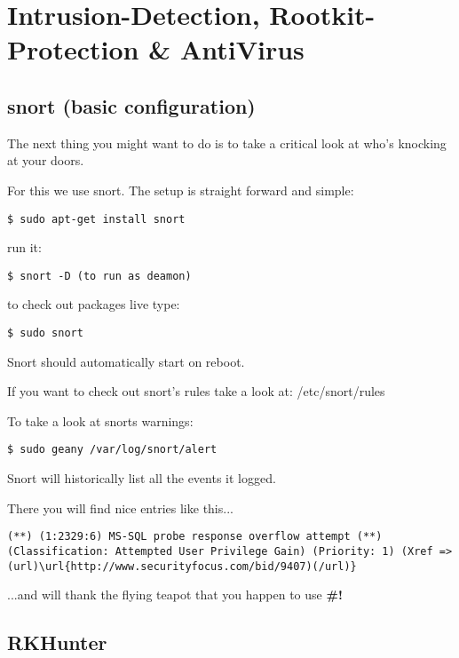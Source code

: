 \documentclass{article}
\begin{document}
\section{Intrusion-Detection, Rootkit-Protection \& AntiVirus}
\subsection{snort (basic configuration)}


 The next thing you might want to do is to take a critical look at who's knocking at your doors.


 For this we use snort. The setup is straight forward and simple: 
\begin{lstlisting}
$ sudo apt-get install snort 
\end{lstlisting}



 run it:
\begin{lstlisting}
$ snort -D (to run as deamon)
\end{lstlisting}



 to check out packages live type:
\begin{lstlisting}
$ sudo snort
\end{lstlisting}



 Snort should automatically start on reboot. 


 If you want to check out snort's rules take a look at: /etc/snort/rules


 To take a look at snorts warnings:
\begin{lstlisting}
$ sudo geany /var/log/snort/alert
\end{lstlisting}



 Snort will historically list all the events it logged. 


 There you will find nice entries like this...
\begin{lstlisting}
(**) (1:2329:6) MS-SQL probe response overflow attempt (**) (Classification: Attempted User Privilege Gain) (Priority: 1) (Xref => (url)\url{http://www.securityfocus.com/bid/9407)(/url)}
\end{lstlisting}



 ...and will thank the flying teapot that you happen to use \textbf{\#!} 
\subsection{RKHunter}
\end{document}
